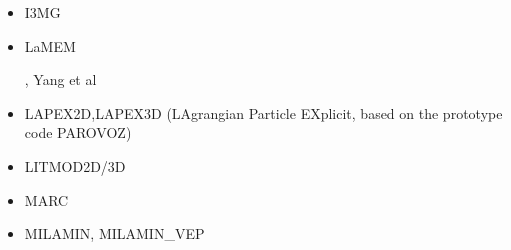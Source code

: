 \begin{itemize}
\item I3MG

{\small
\noindent
\cite{facc14}
}

\item LaMEM 

\begin{scriptsize}
\cite{scbe08}
\cite{kamm10}
\cite{lemk11}
\cite{may12}
\cite{lesh14}\cite{cokm14}\cite{bakp14}\cite{feka14a}\cite{feka14b}
\cite{puka15}\cite{feka15}\cite{cofk15}
\cite{kapb16}\cite{coyc16}
\cite{pukp18}
\cite{eitp19}\cite{hooi19}\cite{pust19}
\cite{eitf20}\cite{spsk20}\cite{pust20}, Yang et al \cite{yakl20}
\end{scriptsize}

\item LAPEX2D,LAPEX3D  (LAgrangian Particle EXplicit, based on the prototype code PAROVOZ) 

\begin{scriptsize}
\cite{sopg05}\cite{baso05}\cite{soba05}
\cite{bube06}\cite{basv06}\cite{sobk06}\cite{peso06}
\cite{peso08}\cite{baso08}\cite{scbe08}
\cite{sosk11}
\end{scriptsize}

\item LITMOD2D/3D

{\small 
\noindent
\cite{afrf07}
\cite{affr08}
\cite{fuac09}
\cite{fufa10}
\cite{jitf19}
}

\item MARC

{\small
\noindent
\cite{nesg97}
\cite{nesb99}
}


\item {\codefont MILAMIN, MILAMIN\_VEP} 


\end{itemize}
